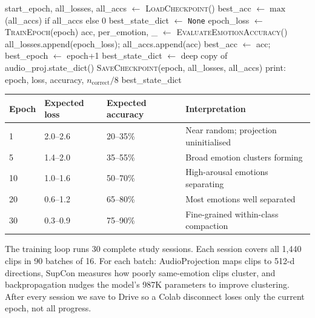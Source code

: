 \documentclass[12pt,a4paper]{article}
\theoremstyle{definition}
\theoremstyle{plain}
\theoremstyle{remark}
\begin{document}
\begin{algorithm}[H]
\caption{Pipeline C Full Training Loop}
\label{alg:full_train}
\begin{algorithmic}[1]
\State start\_epoch, all\_losses, all\_accs $\gets$ \textsc{LoadCheckpoint}()
\State best\_acc $\gets \max$(all\_accs) if all\_accs else $0$
\State best\_state\_dict $\gets$ \texttt{None}
  \State epoch\_loss $\gets$ \textsc{TrainEpoch}(epoch) 
  \State acc, per\_emotion, \_ $\gets$ \textsc{EvaluateEmotionAccuracy}() 
  \State all\_losses.append(epoch\_loss); all\_accs.append(acc)
    \State best\_acc $\gets$ acc; best\_epoch $\gets$ epoch+1
    \State best\_state\_dict $\gets$ deep copy of audio\_proj.state\_dict()
  \EndIf
  \State \textsc{SaveCheckpoint}(epoch, all\_losses, all\_accs) 
  \State print: epoch, loss, accuracy, $n_{\text{correct}}/8$
\EndFor
\State \Return best\_state\_dict
\end{algorithmic}
\end{algorithm}

\begin{center}
\renewcommand{\arraystretch}{1.1}
\begin{tabular}{@{}llll@{}}
\toprule
\textbf{Epoch} & \textbf{Expected loss} & \textbf{Expected accuracy} & \textbf{Interpretation} \\
\midrule
1 & 2.0--2.6 & 20--35\% & Near random; projection uninitialised \\
5 & 1.4--2.0 & 35--55\% & Broad emotion clusters forming \\
10 & 1.0--1.6 & 50--70\% & High-arousal emotions separating \\
20 & 0.6--1.2 & 65--80\% & Most emotions well separated \\
30 & 0.3--0.9 & 75--90\% & Fine-grained within-class compaction \\
\bottomrule
\end{tabular}
\end{center}

\begin{tcolorbox}[layman]
The training loop runs 30 complete study sessions. Each session covers all
1,440 clips in 90 batches of 16. For each batch: AudioProjection maps clips
to 512-d directions, SupCon measures how poorly same-emotion clips cluster,
and backpropagation nudges the model's 987K parameters to improve clustering.
After every session we save to Drive so a Colab disconnect loses only the
current epoch, not all progress.
\end{tcolorbox}
\end{document}
